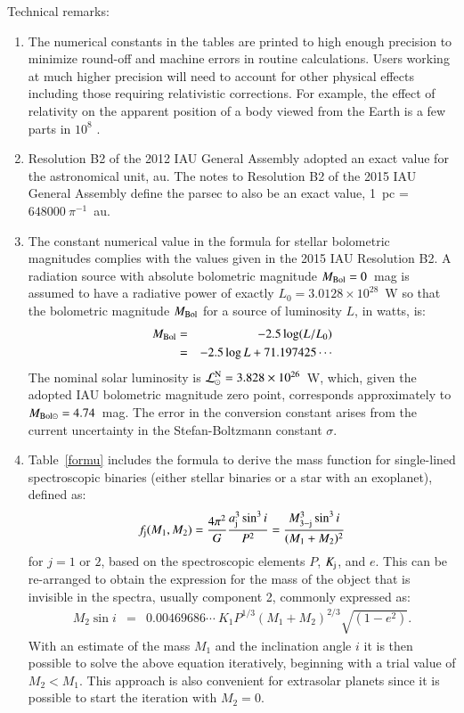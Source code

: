 \documentclass[preprint]{aastex}
\newcommand{\Lnom}{\hbox{$\mathcal{L}^{\mathrm N}_\odot$}}
\newcommand{\rev}[1]{{#1}}
\begin{document}
\bigskip
\noindent Technical remarks:

\begin{enumerate}
\item The numerical constants in the tables are printed to high enough precision to minimize round-off and machine errors in routine calculations. Users working at much higher precision will need to account for other physical effects including those requiring relativistic corrections.  For example, the effect of relativity on the apparent position of a body viewed from the Earth is a few parts in $10^8$ \citep[see][Section B, Reduction of Celestial Coordinates]{almanac}.

\item Resolution B2 of the 2012 IAU General Assembly adopted an exact value for the astronomical unit, au. The notes to Resolution B2 of the 2015 IAU General Assembly define the parsec to also be an exact value, 1~pc = $648000\ \pi^{-1}$~au.

\item The constant numerical value in the formula for stellar bolometric magnitude\rev{s} complies with the values given in the 2015 IAU Resolution B2. A radiation source with absolute bolometric magnitude $M_{\rm Bol}=0$~mag is assumed to have a radiative power of exactly $L_0=3.0128 \times 10^{28}$~W so that the bolometric magnitude $M_{\rm Bol}$ for a source of luminosity $L$, in watts, is:
%
\begin{eqnarray}
M_{\rm Bol} & = & -2.5\log(L/L_0)\nonumber\\
 & = & -2.5\log L + 71.197425 \cdots
\end{eqnarray}
%
The nominal solar luminosity is $\Lnom = 3.828 \times 10^{26}$~W, which, given the adopted IAU bolometric magnitude zero point, corresponds approximately to $M_{\rm Bol\odot} = 4.74$~mag. The error in the conversion constant arises from the current uncertainty in the Stefan-Boltzmann constant $\sigma$.

\item Table~\ref{formu} includes the formula to derive the mass function for single-lined spectroscopic binaries (either stellar binaries or a star with an exoplanet), defined as:
%
\begin{equation}
f_{\rm j}(M_1,M_2) ={4\pi^2\over{G}}{a_{\rm j}^3\sin^3i\over{P^2}} =
{M_{\rm 3-j}^3\sin^3i\over{(M_1+M_2)^2}}
\end{equation}
%
for $j = 1$ or $2$, based on the spectroscopic elements $P$, $K_{\rm j}$, and $e$. This can be re-arranged to obtain the expression for the mass of the object that is invisible in the spectra, usually component 2, commonly expressed as:
%
\begin{eqnarray}
M_2\sin i & = & 0.00469686\cdots\ K_1 P^{1/3} (M_1+M_2)^{2/3}\sqrt{(1-e^2)}.
\end{eqnarray}
%
With an estimate of the mass $M_1$ and the inclination angle $i$ it is then possible to solve the above equation iteratively, beginning with a trial value of $M_2 < M_1$. This approach is also convenient for extrasolar planets since it is possible to start the iteration with $M_2=0$.
\end{enumerate}
\end{document}
